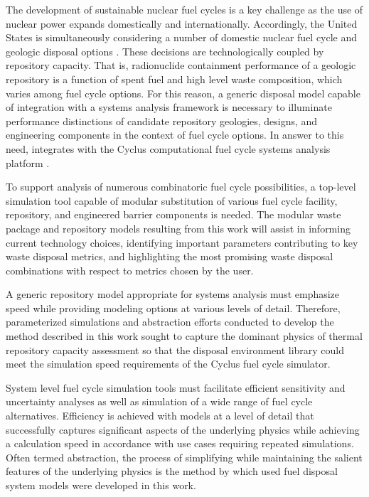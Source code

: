 
The development of sustainable nuclear fuel cycles is a key challenge as the 
use of nuclear power expands domestically and internationally.  Accordingly, 
the United States is simultaneously considering a number of domestic nuclear fuel 
cycle and geologic disposal options \cite{doe_strategy_2013}.  These decisions 
are technologically coupled by repository capacity. That is, 
radionuclide containment performance of a geologic repository is a function of 
spent fuel and high level waste composition, which varies among fuel cycle 
options. For this reason, a generic disposal model capable of integration 
with a systems analysis framework is necessary to illuminate performance 
distinctions of candidate repository geologies, designs, and engineering 
components in the context of fuel cycle options.  In answer to this need, \Cyder 
integrates with the Cyclus computational fuel cycle systems analysis platform 
\cite{huff_cyder_2013,wilson_cyclus:_2012}. 



To support analysis of numerous combinatoric fuel cycle possibilities, a 
top-level simulation tool capable of modular substitution of various fuel cycle 
facility, repository, and engineered barrier components is needed. The modular 
waste package and repository models resulting from this work will assist in 
informing current technology choices, identifying important parameters 
contributing to key waste disposal metrics, and highlighting the most promising 
waste disposal combinations with respect to metrics chosen by the user. 


A generic repository model appropriate for systems analysis must emphasize 
speed while providing modeling options at various levels of 
detail. Therefore, parameterized simulations and abstraction efforts conducted to develop 
the method described in this work sought to capture the dominant physics of 
thermal repository capacity assessment so that the \Cyder disposal environment 
library could meet the simulation speed requirements of the Cyclus fuel cycle 
simulator.


System level fuel cycle simulation tools must facilitate efficient sensitivity 
and uncertainty analyses as well as simulation of a wide range of fuel cycle 
alternatives.  Efficiency is achieved with models at a level of detail that 
successfully captures significant aspects of the underlying physics while 
achieving a calculation speed in accordance with use cases requiring repeated 
simulations.
Often termed abstraction, the process of simplifying while 
maintaining the salient features of the underlying physics is the method by 
which used fuel disposal system models were developed in this work. 

